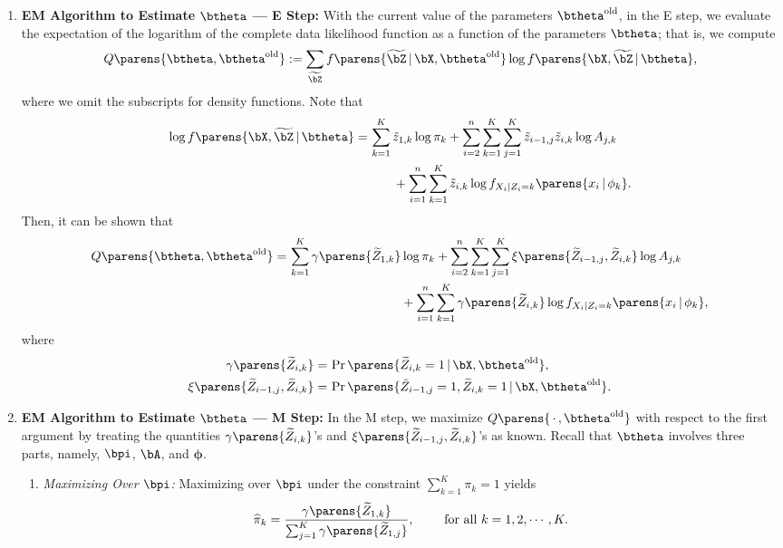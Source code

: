 \documentclass[12pt]{article}
\begin{document}
\begin{enumerate}[label=\textbf{\arabic*.}]
	\item \textbf{EM Algorithm to Estimate $\btheta$ --- E Step:} With the current value of the parameters $\btheta^{\mathrm{old}}$, in the E step, we evaluate the expectation of the logarithm of the complete data likelihood function as a function of the parameters $\btheta$; that is, we compute 
	\begin{align}
		Q \parens{\btheta, \btheta^{\mathrm{old}}} := \sum_{\widetilde{\bZ}} f \parens{\widetilde{\bZ} \,\vert\, \bX, \btheta^{\mathrm{old}}} \log f \parens{\bX, \widetilde{\bZ} \,\vert\, \btheta}, 
	\end{align}
	where we omit the subscripts for density functions. Note that 
	\begin{align*}
		\log f \parens{\bX, \widetilde{\bZ} \,\vert\, \btheta} = & \, \sum_{k=1}^K \tilde{z}_{1,k} \log \pi_k + \sum_{i=2}^n \sum_{k=1}^K \sum_{j=1}^K \tilde{z}_{i-1,j} \tilde{z}_{i, k} \log A_{j, k} \\ 
		& \qquad + \sum_{i=1}^n \sum_{k=1}^K \tilde{z}_{i,k} \log f_{X_i \vert Z_i = k} \parens{x_i \,\vert\, \phi_k}. 
	\end{align*}
	Then, it can be shown that 
	\begin{align*}
		Q \parens{\btheta, \btheta^{\mathrm{old}}} = & \, \sum_{k=1}^K \gamma \parens{\widetilde{Z}_{1,k}} \log \pi_k + \sum_{i=2}^n \sum_{k=1}^K \sum_{j=1}^K \xi \parens{\widetilde{Z}_{i-1,j}, \widetilde{Z}_{i,k}} \log A_{j,k} \\ 
		& \qquad \qquad \qquad \qquad \quad + \sum_{i=1}^n \sum_{k=1}^K \gamma \parens{\widetilde{Z}_{i,k}} \log f_{X_i \vert Z_i = k} \parens{x_i \,\vert\, \phi_k}, 
	\end{align*}
	where 
	\begin{align*}
		\gamma \parens{\widetilde{Z}_{i,k}} = & \, \Pr \parens{\widetilde{Z}_{i,k} = 1 \,\vert\, \bX, \btheta^{\mathrm{old}}}, \\ 
		\xi \parens{\widetilde{Z}_{i-1,j}, \widetilde{Z}_{i,k}} = & \, \Pr \parens{\tilde{Z}_{i-1,j} = 1, \widetilde{Z}_{i,k} = 1 \,\vert\, \bX, \btheta^{\mathrm{old}}}. 
	\end{align*}
	
	\item \textbf{EM Algorithm to Estimate $\btheta$ --- M Step:} In the M step, we maximize $Q \parens{\,\cdot\,, \btheta^{\mathrm{old}}}$ with respect to the first argument by treating the quantities $\gamma \parens{\widetilde{Z}_{i,k}}$'s and $\xi \parens{\widetilde{Z}_{i-1,j}, \widetilde{Z}_{i,k}}$'s as known. Recall that $\btheta$ involves three parts, namely, $\bpi$, $\bA$, and $\boldsymbol{\phi}$. 
	\begin{enumerate}
		\item \textit{Maximizing Over $\bpi$:} Maximizing over $\bpi$ under the constraint $\sum_{k=1}^K \pi_k = 1$ yields 
		\begin{align*}
			\widehat{\pi}_k = \frac{\gamma \parens{\widetilde{Z}_{1,k}}}{\sum_{j=1}^K \gamma \parens{\widetilde{Z}_{1,j}}}, \qquad \text{ for all } k = 1, 2, \cdots, K. 
		\end{align*}
		

\end{enumerate}
\end{enumerate}
\end{document}
